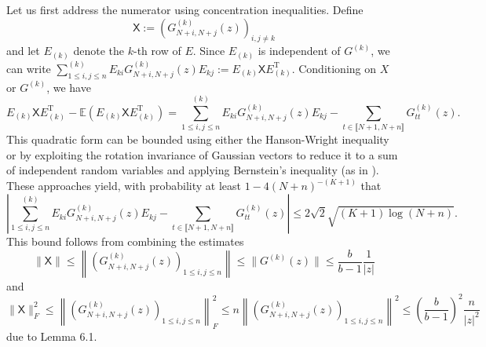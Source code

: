 \documentclass[reqno]{amsart}
\newcommand{\E}{\mathbb{E}}
\newcommand{\T}{\mathrm{T}}
\theoremstyle{plain}
\theoremstyle{definition}
\begin{document}
Let us first address the numerator using concentration inequalities. Define $$\mathsf X:=\left(G_{N+i,N+j}^{(k)}(z)\right)_{i,j\neq k}$$ and let $E_{(k)}$ denote the $k$-th row of $E$. Since $E_{(k)}$ is independent of $G^{(k)}$, we can write $\sum_{1\le i,j\le n}^{(k)} E_{ki} G_{N+i,N+j}^{(k)}(z) E_{kj} := E_{(k)} \mathsf{X} E_{(k)}^\T$. Conditioning on $X$ or $G^{(k)}$, we have 
\[ E_{(k)} \mathsf{X} E_{(k)}^\T - \E (E_{(k)} \mathsf{X} E_{(k)}^\T) = \sum_{1\le i,j\le n}^{(k)} E_{ki} G_{N+i,N+j}^{(k)}(z) E_{kj}  - \sum_{t \in \llbracket N+1,N+n \rrbracket} G_{tt}^{(k)}(z).\]
This quadratic form can be bounded using either the Hanson-Wright inequality \cite{HW} or by exploiting the rotation invariance of Gaussian vectors to reduce it to a sum of independent random variables and applying Bernstein's inequality (as in \cite[Lemma 28]{OVW22}). These approaches yield, with probability at least $1-4(N+n)^{-(K+1)}$ that 
\begin{equation} \label{eq:HW1}
\left|\sum_{1\le i,j\le n}^{(k)} E_{ki} G_{N+i,N+j}^{(k)}(z) E_{kj}  - \sum_{t \in \llbracket N+1,N+n \rrbracket} G_{tt}^{(k)}(z) \right| \le 2\sqrt{2} \sqrt{(K+1)\log(N+n)}. 
\end{equation} 
This bound follows from combining the estimates
\[ \| \mathsf X\| \le \left\|\left(G_{N+i,N+j}^{(k)}(z)\right)_{1\le i,j\le n} \right\| \leq \| G^{(k)}(z) \|\leq \frac{b}{b-1}\frac{1}{|z|}  \]
and
\[ \|\mathsf X\|_F^2 \le \left\|\left(G_{N+i,N+j}^{(k)}(z)\right)_{1\le i,j\le n} \right\|_F^2 \leq n \left\|\left(G_{N+i,N+j}^{(k)}(z)\right)_{1\le i,j\le n} \right\|^2\le \left(\frac{b}{b-1}\right)^2\frac{n}{|z|^2} \]
due to Lemma 6.1.
\end{document}
